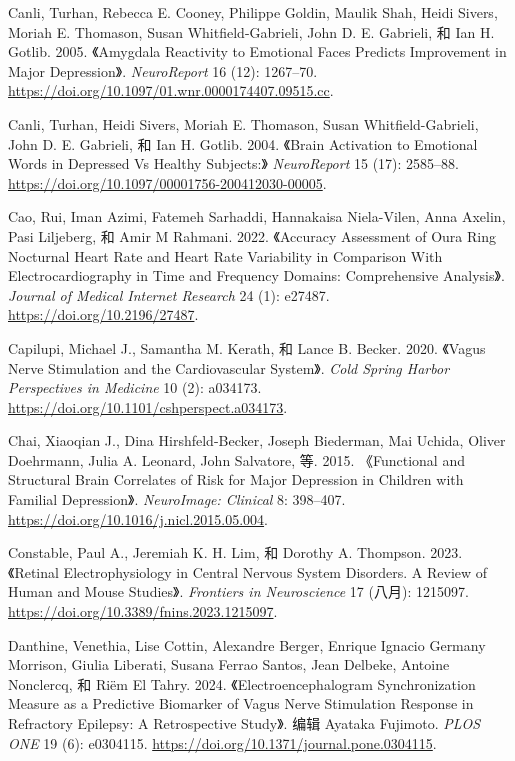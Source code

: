 \documentclass[
  Letterpaper,
]{scrbook}
\newlength{\cslhangindent}
\newenvironment{CSLReferences}[2] %
 {\begin{list}{}{%
  \setlength{\itemindent}{0pt}
  \setlength{\leftmargin}{0pt}
  \setlength{\parsep}{0pt}
  \ifodd #1
   \setlength{\leftmargin}{\cslhangindent}
   \setlength{\itemindent}{-1\cslhangindent}
  \fi
  \setlength{\itemsep}{#2\baselineskip}}}
 {\end{list}}
\begin{document}
\begin{CSLReferences}{1}{0}
Canli, Turhan, Rebecca E. Cooney, Philippe Goldin, Maulik Shah, Heidi
Sivers, Moriah E. Thomason, Susan Whitfield-Gabrieli, John D. E.
Gabrieli, 和 Ian H. Gotlib. 2005. {《Amygdala Reactivity to Emotional
Faces Predicts Improvement in Major Depression》}. \emph{NeuroReport} 16
(12): 1267--70.
\url{https://doi.org/10.1097/01.wnr.0000174407.09515.cc}.

Canli, Turhan, Heidi Sivers, Moriah E. Thomason, Susan
Whitfield-Gabrieli, John D. E. Gabrieli, 和 Ian H. Gotlib. 2004.
{《Brain Activation to Emotional Words in Depressed Vs Healthy
Subjects:》} \emph{NeuroReport} 15 (17): 2585--88.
\url{https://doi.org/10.1097/00001756-200412030-00005}.

Cao, Rui, Iman Azimi, Fatemeh Sarhaddi, Hannakaisa Niela-Vilen, Anna
Axelin, Pasi Liljeberg, 和 Amir M Rahmani. 2022. {《Accuracy
{Assessment} of {Oura Ring Nocturnal Heart Rate} and {Heart Rate
Variability} in {Comparison With Electrocardiography} in {Time} and
{Frequency Domains}: {Comprehensive Analysis}》}. \emph{Journal of
Medical Internet Research} 24 (1): e27487.
\url{https://doi.org/10.2196/27487}.

Capilupi, Michael J., Samantha M. Kerath, 和 Lance B. Becker. 2020.
{《Vagus {Nerve Stimulation} and the {Cardiovascular System}》}.
\emph{Cold Spring Harbor Perspectives in Medicine} 10 (2): a034173.
\url{https://doi.org/10.1101/cshperspect.a034173}.

Chai, Xiaoqian J., Dina Hirshfeld-Becker, Joseph Biederman, Mai Uchida,
Oliver Doehrmann, Julia A. Leonard, John Salvatore, 等. 2015.
{《Functional and Structural Brain Correlates of Risk for Major
Depression in Children with Familial Depression》}. \emph{NeuroImage:
Clinical} 8: 398--407. \url{https://doi.org/10.1016/j.nicl.2015.05.004}.

Constable, Paul A., Jeremiah K. H. Lim, 和 Dorothy A. Thompson. 2023.
{《Retinal Electrophysiology in Central Nervous System Disorders. {A}
Review of Human and Mouse Studies》}. \emph{Frontiers in Neuroscience}
17 (八月): 1215097. \url{https://doi.org/10.3389/fnins.2023.1215097}.

Danthine, Venethia, Lise Cottin, Alexandre Berger, Enrique Ignacio
Germany Morrison, Giulia Liberati, Susana Ferrao Santos, Jean Delbeke,
Antoine Nonclercq, 和 Riëm El Tahry. 2024. {《Electroencephalogram
Synchronization Measure as a Predictive Biomarker of {Vagus} Nerve
Stimulation Response in Refractory Epilepsy: {A} Retrospective Study》}.
编辑 Ayataka Fujimoto. \emph{PLOS ONE} 19 (6): e0304115.
\url{https://doi.org/10.1371/journal.pone.0304115}.


\end{CSLReferences}
\end{document}
